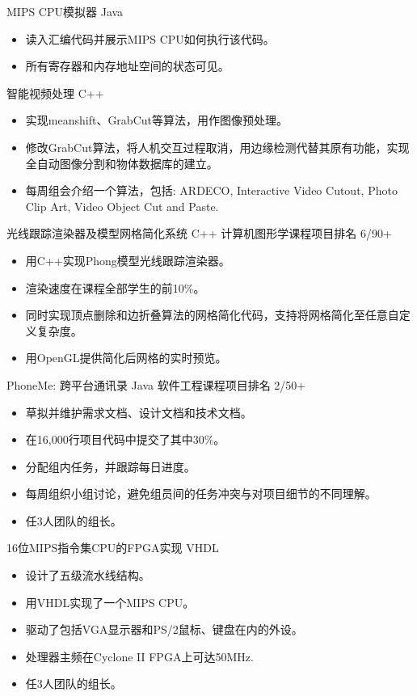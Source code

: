 \documentclass[10pt,a4paper]{moderncv/moderncv}
\begin{document}
{MIPS CPU模拟器}
{Java}
{}{}
{
\begin{itemize}
	\item 读入汇编代码并展示MIPS CPU如何执行该代码。
	\item 所有寄存器和内存地址空间的状态可见。
\end{itemize}
}

{智能视频处理}
{C++}
{}{}
{
\begin{itemize}
	\item 实现meanshift、GrabCut等算法，用作图像预处理。
	\item 修改GrabCut算法，将人机交互过程取消，用边缘检测代替其原有功能，实现全自动图像分割和物体数据库的建立。
	\item 每周组会介绍一个算法，包括: ARDECO, Interactive Video Cutout, Photo Clip Art, Video Object Cut and Paste.
\end{itemize}
}

{光线跟踪渲染器及模型网格简化系统}
{C++}
{计算机图形学课程项目}{排名 6/90+}
{
\begin{itemize}
	\item 用C++实现Phong模型光线跟踪渲染器。
	\item 渲染速度在课程全部学生的前10\%。
	\item 同时实现顶点删除和边折叠算法的网格简化代码，支持将网格简化至任意自定义复杂度。
	\item 用OpenGL提供简化后网格的实时预览。
\end{itemize}
}

{PhoneMe: 跨平台通讯录}
{Java}
{软件工程课程项目}{排名 2/50+}
{
\begin{itemize}
	\item 草拟并维护需求文档、设计文档和技术文档。
	\item 在16,000行项目代码中提交了其中30\%。
	\item 分配组内任务，并跟踪每日进度。
	\item 每周组织小组讨论，避免组员间的任务冲突与对项目细节的不同理解。
	\item 任3人团队的组长。
\end{itemize}
}


{16位MIPS指令集CPU的FPGA实现}
{VHDL}
{}{}
{
\begin{itemize}
	\item 设计了五级流水线结构。
	\item 用VHDL实现了一个MIPS CPU。
	\item 驱动了包括VGA显示器和PS/2鼠标、键盘在内的外设。
	\item 处理器主频在Cyclone II FPGA上可达50MHz.
	\item 任3人团队的组长。	
\end{itemize}
}
\end{document}

